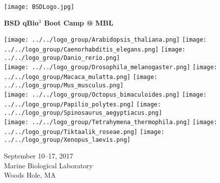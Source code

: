 \documentclass{article}
\begin{document}
\begin{centering}
\texttt{[image: BSDLogo.jpg]}

\vspace{0.11in}

\Huge{\textbf{BSD qBio$^3$ Boot Camp @ MBL}}

\vspace{0.4in}

\texttt{[image: ../../logo\_group/Arabidopsis\_thaliana.png]}
\texttt{[image: ../../logo\_group/Caenorhabditis\_elegans.png]}
\texttt{[image: ../../logo\_group/Danio\_rerio.png]}\\
\texttt{[image: ../../logo\_group/Drosophila\_melanogaster.png]}
\texttt{[image: ../../logo\_group/Macaca\_mulatta.png]}
\texttt{[image: ../../logo\_group/Mus\_musculus.png]}\\
\texttt{[image: ../../logo\_group/Octopus\_bimaculoides.png]}
\texttt{[image: ../../logo\_group/Papilio\_polytes.png]}
\texttt{[image: ../../logo\_group/Spinosaurus\_aegyptiacus.png]}\\
\texttt{[image: ../../logo\_group/Tetrahymena\_thermophila.png]}
\texttt{[image: ../../logo\_group/Tiktaalik\_roseae.png]}
\texttt{[image: ../../logo\_group/Xenopus\_laevis.png]}

\vspace{0.4in}

\Large{September 10--17, 2017}\\
\Large{Marine Biological Laboratory}\\
\Large{Woods Hole, MA}

\end{centering}
\end{document}
